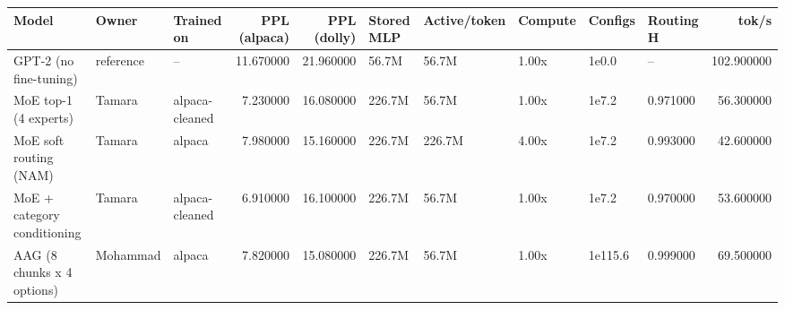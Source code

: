 \begin{tabular}{lllrrlllllr}
\toprule
Model & Owner & Trained on & PPL (alpaca) & PPL (dolly) & Stored MLP & Active/token & Compute & Configs & Routing H & tok/s \\
\midrule
GPT-2 (no fine-tuning) & reference & -- & 11.670000 & 21.960000 & 56.7M & 56.7M & 1.00x & 1e0.0 & -- & 102.900000 \\
MoE top-1 (4 experts) & Tamara & alpaca-cleaned & 7.230000 & 16.080000 & 226.7M & 56.7M & 1.00x & 1e7.2 & 0.971000 & 56.300000 \\
MoE soft routing (NAM) & Tamara & alpaca & 7.980000 & 15.160000 & 226.7M & 226.7M & 4.00x & 1e7.2 & 0.993000 & 42.600000 \\
MoE + category conditioning & Tamara & alpaca-cleaned & 6.910000 & 16.100000 & 226.7M & 56.7M & 1.00x & 1e7.2 & 0.970000 & 53.600000 \\
AAG (8 chunks x 4 options) & Mohammad & alpaca & 7.820000 & 15.080000 & 226.7M & 56.7M & 1.00x & 1e115.6 & 0.999000 & 69.500000 \\
\bottomrule
\end{tabular}
